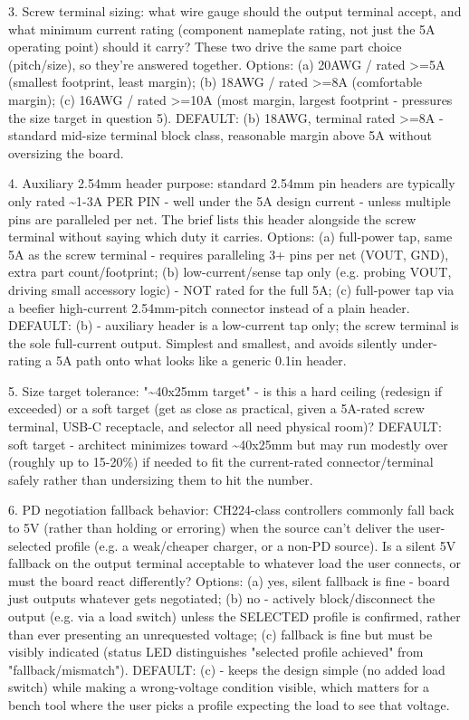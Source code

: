 \documentclass[11pt,a4paper]{article}
\begin{document}
3. Screw terminal sizing: what wire gauge should the output terminal accept, and what minimum current rating (component nameplate rating, not just the 5A operating point) should it carry? These two drive the same part choice (pitch/size), so they're answered together. Options: (a) 20AWG / rated \textgreater{}=5A (smallest footprint, least margin); (b) 18AWG / rated \textgreater{}=8A (comfortable margin); (c) 16AWG / rated \textgreater{}=10A (most margin, largest footprint - pressures the size target in question 5). DEFAULT: (b) 18AWG, terminal rated \textgreater{}=8A - standard mid-size terminal block class, reasonable margin above 5A without oversizing the board.

4. Auxiliary 2.54mm header purpose: standard 2.54mm pin headers are typically only rated \textasciitilde{}1-3A PER PIN - well under the 5A design current - unless multiple pins are paralleled per net. The brief lists this header alongside the screw terminal without saying which duty it carries. Options: (a) full-power tap, same 5A as the screw terminal - requires paralleling 3+ pins per net (VOUT, GND), extra part count/footprint; (b) low-current/sense tap only (e.g. probing VOUT, driving small accessory logic) - NOT rated for the full 5A; (c) full-power tap via a beefier high-current 2.54mm-pitch connector instead of a plain header. DEFAULT: (b) - auxiliary header is a low-current tap only; the screw terminal is the sole full-current output. Simplest and smallest, and avoids silently under-rating a 5A path onto what looks like a generic 0.1in header.

5. Size target tolerance: "\textasciitilde{}40x25mm target" - is this a hard ceiling (redesign if exceeded) or a soft target (get as close as practical, given a 5A-rated screw terminal, USB-C receptacle, and selector all need physical room)? DEFAULT: soft target - architect minimizes toward \textasciitilde{}40x25mm but may run modestly over (roughly up to 15-20\%) if needed to fit the current-rated connector/terminal safely rather than undersizing them to hit the number.

6. PD negotiation fallback behavior: CH224-class controllers commonly fall back to 5V (rather than holding or erroring) when the source can't deliver the user-selected profile (e.g. a weak/cheaper charger, or a non-PD source). Is a silent 5V fallback on the output terminal acceptable to whatever load the user connects, or must the board react differently? Options: (a) yes, silent fallback is fine - board just outputs whatever gets negotiated; (b) no - actively block/disconnect the output (e.g. via a load switch) unless the SELECTED profile is confirmed, rather than ever presenting an unrequested voltage; (c) fallback is fine but must be visibly indicated (status LED distinguishes "selected profile achieved" from "fallback/mismatch"). DEFAULT: (c) - keeps the design simple (no added load switch) while making a wrong-voltage condition visible, which matters for a bench tool where the user picks a profile expecting the load to see that voltage.
\end{document}
